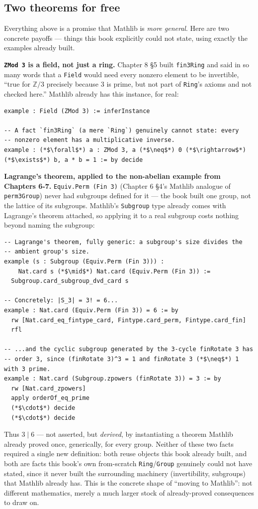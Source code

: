 \subsection{Two theorems for free}\label{sec:13-next-steps:02-moving-to-mathlib:2}

Everything above is a promise that Mathlib is \emph{more general}. Here are two concrete payoffs --- things this book explicitly could not state, using exactly the examples already built.

\textbf{\texttt{ZMod 3} is a field, not just a ring.} Chapter 8 §5 built \texttt{fin3Ring} and said in so many words that a \texttt{Field} would need every nonzero element to be invertible, ``true for \(\mathbb{Z}/3\) precisely because \(3\) is prime, but not part of \texttt{Ring}'s axioms and not checked here.'' Mathlib already has this instance, for real:

\begin{lstlisting}
example : Field (ZMod 3) := inferInstance

-- A fact `fin3Ring` (a mere `Ring`) genuinely cannot state: every
-- nonzero element has a multiplicative inverse.
example : (*$\forall$*) a : ZMod 3, a (*$\neq$*) 0 (*$\rightarrow$*) (*$\exists$*) b, a * b = 1 := by decide
\end{lstlisting}

\textbf{Lagrange's theorem, applied to the non-abelian example from Chapters 6-7.} \texttt{Equiv.Perm (Fin 3)} (Chapter 6 §4's Mathlib analogue of \texttt{perm3Group}) never had subgroups defined for it --- the book built one group, not the lattice of its subgroups. Mathlib's \texttt{Subgroup} type already comes with Lagrange's theorem attached, so applying it to a real subgroup costs nothing beyond naming the subgroup:

\begin{lstlisting}
-- Lagrange's theorem, fully generic: a subgroup's size divides the
-- ambient group's size.
example (s : Subgroup (Equiv.Perm (Fin 3))) :
    Nat.card s (*$\mid$*) Nat.card (Equiv.Perm (Fin 3)) :=
  Subgroup.card_subgroup_dvd_card s

-- Concretely: |S_3| = 3! = 6...
example : Nat.card (Equiv.Perm (Fin 3)) = 6 := by
  rw [Nat.card_eq_fintype_card, Fintype.card_perm, Fintype.card_fin]
  rfl

-- ...and the cyclic subgroup generated by the 3-cycle finRotate 3 has
-- order 3, since (finRotate 3)^3 = 1 and finRotate 3 (*$\neq$*) 1 with 3 prime.
example : Nat.card (Subgroup.zpowers (finRotate 3)) = 3 := by
  rw [Nat.card_zpowers]
  apply orderOf_eq_prime
  (*$\cdot$*) decide
  (*$\cdot$*) decide
\end{lstlisting}

Thus \(3 \mid 6\) --- not asserted, but \emph{derived}, by instantiating a theorem Mathlib already proved once, generically, for every group. Neither of these two facts required a single new definition: both reuse objects this book already built, and both are facts this book's own from-scratch \texttt{Ring}/\texttt{Group} genuinely could not have stated, since it never built the surrounding machinery (invertibility, subgroups) that Mathlib already has. This is the concrete shape of ``moving to Mathlib'': not different mathematics, merely a much larger stock of already-proved consequences to draw on.
